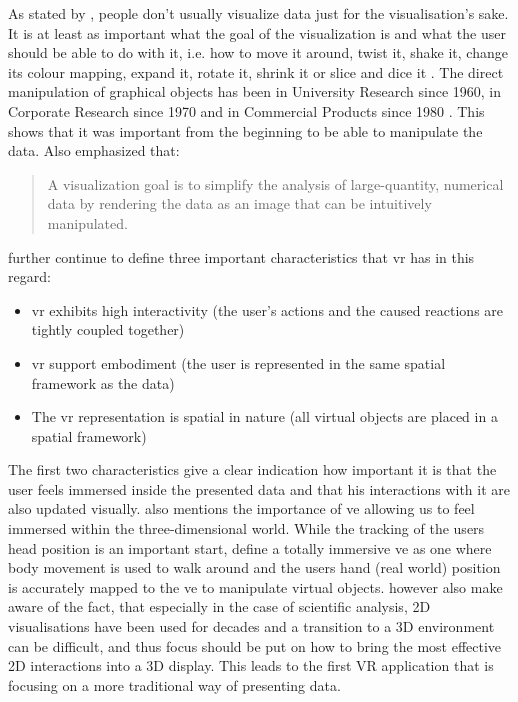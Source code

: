 As stated by \cite{Stone1994}, people don't usually visualize data just for the visualisation's sake. It is at least as important what the goal of the visualization is and what the user should be able to do with it, i.e. how to move it around, twist it, shake it, change its colour mapping, expand it, rotate it, shrink it or slice and dice it \citep{Stone1994}. The direct manipulation of graphical objects has been in University Research since 1960, in Corporate Research since 1970 and in Commercial Products since 1980 \citep{Myers1998}. This shows that it was important from the beginning to be able to manipulate the data. Also \citet[p.410]{Stone1994} emphasized that: \blockquote{A visualization goal is to simplify the analysis of large-quantity, numerical data by rendering the data as an image that can be intuitively manipulated.} \cite{Stone1994} further continue to define three important characteristics that \gls{vr} has in this regard:
\begin{itemize}[noitemsep,nolistsep]
	\item \gls{vr} exhibits high interactivity (the user's actions and the caused reactions are tightly coupled together)
	\item \gls{vr} support embodiment (the user is represented  in the same spatial framework as the data)
	\item The \gls{vr} representation is spatial in nature (all virtual objects are placed in a spatial framework)
\end{itemize}
The first two characteristics give a clear indication how important it is that the user feels immersed inside the presented data and that his interactions with it are also updated visually. \cite{Jamieson2007} also mentions the importance of \gls{ve} allowing us to feel immersed within the three-dimensional world. While the tracking of the users head position is an important start, \cite{Jamieson2007} define a totally immersive \gls{ve} as one where body movement is used to walk around and the users hand (real world) position is accurately mapped to the \gls{ve} to manipulate virtual objects. \cite{Drouhard2015} however also make aware of the fact, that especially in the case of scientific analysis, 2D visualisations have been used for decades and a transition to a 3D environment can be difficult, and thus focus should be put on how to bring the most effective 2D interactions into a 3D display. \newline
This leads to the first VR application that is focusing on a more traditional way of presenting data.


